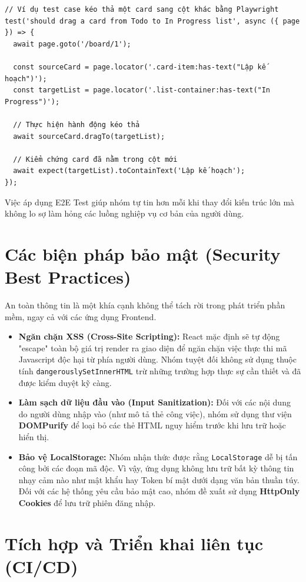 \begin{Verbatim}
// Ví dụ test case kéo thả một card sang cột khác bằng Playwright
test('should drag a card from Todo to In Progress list', async ({ page }) => {
  await page.goto('/board/1');

  const sourceCard = page.locator('.card-item:has-text("Lập kế hoạch")');
  const targetList = page.locator('.list-container:has-text("In Progress")');

  // Thực hiện hành động kéo thả
  await sourceCard.dragTo(targetList);

  // Kiểm chứng card đã nằm trong cột mới
  await expect(targetList).toContainText('Lập kế hoạch');
});
\end{Verbatim}

Việc áp dụng E2E Test giúp nhóm tự tin hơn mỗi khi thay đổi kiến trúc lớn mà không lo sợ làm hỏng các luồng nghiệp vụ cơ bản của người dùng.

\section{Các biện pháp bảo mật (Security Best Practices)}
An toàn thông tin là một khía cạnh không thể tách rời trong phát triển phần mềm, ngay cả với các ứng dụng Frontend.

\begin{itemize}
    \item \textbf{Ngăn chặn XSS (Cross-Site Scripting):} React mặc định sẽ tự động "escape" toàn bộ giá trị render ra giao diện để ngăn chặn việc thực thi mã Javascript độc hại từ phía người dùng. Nhóm tuyệt đối không sử dụng thuộc tính \texttt{dangerouslySetInnerHTML} trừ những trường hợp thực sự cần thiết và đã được kiểm duyệt kỹ càng.
    \item \textbf{Làm sạch dữ liệu đầu vào (Input Sanitization):} Đối với các nội dung do người dùng nhập vào (như mô tả thẻ công việc), nhóm sử dụng thư viện \textbf{DOMPurify} để loại bỏ các thẻ HTML nguy hiểm trước khi lưu trữ hoặc hiển thị.
    \item \textbf{Bảo vệ LocalStorage:} Nhóm nhận thức được rằng \texttt{LocalStorage} dễ bị tấn công bởi các đoạn mã độc. Vì vậy, ứng dụng không lưu trữ bất kỳ thông tin nhạy cảm nào như mật khẩu hay Token bí mật dưới dạng văn bản thuần túy. Đối với các hệ thống yêu cầu bảo mật cao, nhóm đề xuất sử dụng \textbf{HttpOnly Cookies} để lưu trữ phiên đăng nhập.
\end{itemize}

\section{Tích hợp và Triển khai liên tục (CI/CD)}


